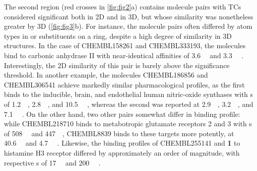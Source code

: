 \documentclass[../main.tex]{subfiles}
\begin{document}
\begin{refsection}
The second region (red crosses in \cref{fig:fig2}a) contains molecule pairs with TCs considered significant both in 2D and in 3D, but whose similarity was nonetheless greater by 3D (\cref{fig:fig3}b).
For instance, the molecule pairs often differed by atom types in or substituents on a ring, despite a high degree of similarity in 3D structures.
In the case of CHEMBL158261 and CHEMBL333193, the molecules bind to carbonic anhydrase II with near-identical affinities of \SI{3.6}{\nano\molar} and \SI{3.3}{\nano\molar} \cite{ponticello_1987}.
Interestingly, the 2D similarity of this pair is barely above the significance threshold.
In another example, the molecules CHEMBL186856 and CHEMBL306541 achieve markedly similar pharmacological profiles, as the first binds to the inducible, brain, and endothelial human nitric-oxide synthases with  \ICfifty s of \SI{1.2}{\micro\molar}, \SI{2.8}{\micro\molar}, and \SI{10.5}{\micro\molar} \cite{shankaran_2004}, whereas the second was reported at \SI{2.9}{\micro\molar}, \SI{3.2}{\micro\molar}, and \SI{7.1}{\micro\molar} \cite{moore_1996}.
On the other hand, two other pairs somewhat differ in binding profile: while CHEMBL218710 binds to metabotropic glutamate receptors 2 and 3 with \Ki s of \SI{508}{\nano\molar} and \SI{447}{\nano\molar}, CHEMBL8839 binds to these targets more potently, at \SI{40.6}{\nano\molar} and \SI{4.7}{\nano\molar} \cite{monn_2007}.
Likewise, the binding profiles of CHEMBL255141 and \textbf{1} to histamine H3 receptor differed by approximately an order of magnitude, with respective  \Ki s of \SI{17}{\nano\molar} and \SI{200}{\nano\molar} \cite{nersesian_2008}.


\end{refsection}
\end{document}
